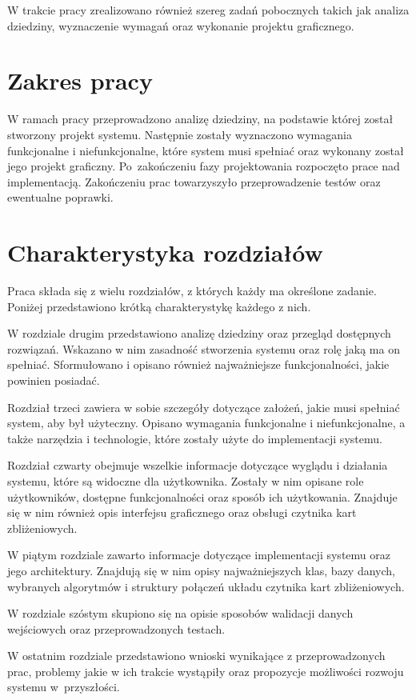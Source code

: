 W trakcie pracy zrealizowano również szereg zadań pobocznych takich jak analiza dziedziny, wyznaczenie wymagań oraz wykonanie projektu graficznego.

\section{Zakres pracy}

W ramach pracy przeprowadzono analizę dziedziny, na podstawie której został stworzony projekt systemu. Następnie zostały wyznaczono wymagania funkcjonalne i niefunkcjonalne, które system musi spełniać oraz wykonany został jego projekt graficzny. Po~zakończeniu fazy projektowania rozpoczęto prace nad implementacją. Zakończeniu prac towarzyszyło przeprowadzenie testów oraz ewentualne poprawki.

\section{Charakterystyka rozdziałów}

Praca składa się z wielu rozdziałów, z których każdy ma określone zadanie. Poniżej przedstawiono krótką charakterystykę każdego z nich.

W rozdziale drugim przedstawiono analizę dziedziny oraz przegląd dostępnych rozwiązań. Wskazano w nim zasadność stworzenia systemu oraz rolę jaką ma on spełniać. Sformułowano i opisano również najważniejsze funkcjonalności, jakie powinien posiadać.

Rozdział trzeci zawiera w sobie szczegóły dotyczące założeń, jakie musi spełniać system, aby był użyteczny. Opisano wymagania funkcjonalne i niefunkcjonalne, a także narzędzia i technologie, które zostały użyte do implementacji systemu.

Rozdział czwarty obejmuje wszelkie informacje dotyczące wyglądu i działania systemu, które są widoczne dla użytkownika. Zostały w nim opisane role użytkowników, dostępne funkcjonalności oraz sposób ich użytkowania. Znajduje się w nim również opis interfejsu graficznego oraz obsługi czytnika kart zbliżeniowych.

W piątym rozdziale zawarto informacje dotyczące implementacji systemu oraz jego architektury. Znajdują się w nim opisy najważniejszych klas, bazy danych, wybranych algorytmów i struktury połączeń układu czytnika kart zbliżeniowych.

W rozdziale szóstym skupiono się na opisie sposobów walidacji danych wejściowych oraz przeprowadzonych testach.

W ostatnim rozdziale przedstawiono wnioski wynikające z przeprowadzonych prac, problemy jakie w ich trakcie wystąpiły oraz propozycje możliwości rozwoju systemu w~przyszłości.


